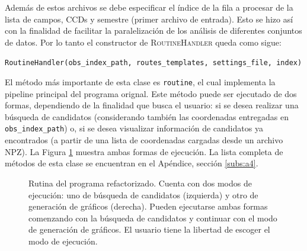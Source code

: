 Adem\'as de estos archivos se debe especificar el \'indice de la fila a procesar de la lista de campos, CCDs y semestre (primer archivo de entrada). Esto se hizo as\'i con la finalidad de facilitar la paralelizaci\'on de los an\'alisis de diferentes conjuntos de datos. Por lo tanto el constructor de \textsc{RoutineHandler} queda como sigue:

\begin{center}
\texttt{RoutineHandler(obs\_index\_path, routes\_templates, settings\_file, index)}
\end{center}

El m\'etodo m\'as importante de esta clase es \texttt{routine}, el cual implementa la pipeline principal del programa orignal. Este m\'etodo puede ser ejecutado de dos formas, dependiendo de la finalidad que busca el usuario: si se desea realizar una b\'usqueda de candidatos (considerando tambi\'en las coordenadas entregadas en \texttt{obs\_index\_path}) o, si se desea visualizar informaci\'on de candidatos ya encontrados (a partir de una lista de coordenadas cargadas desde un archivo NPZ). La Figura \ref{fig:new_routine} muestra ambas formas de ejecuci\'on. La lista completa de m\'etodos de esta clase se encuentran en el Ap\'endice, secci\'on \ref{subs:a4}.

\begin{figure}
\centering
    \qquad
\caption{Rutina del programa refactorizado. Cuenta con dos modos de ejecuci\'on: uno de b\'usqueda de candidatos (izquierda) y otro de generaci\'on de gr\'aficos (derecha). Pueden ejecutarse ambas formas comenzando con la b\'usqueda de candidatos y continuar con el modo de generaci\'on de gr\'aficos. El usuario tiene la libertad de escoger el modo de ejecuci\'on.}
\label{fig:new_routine}
\end{figure}  
